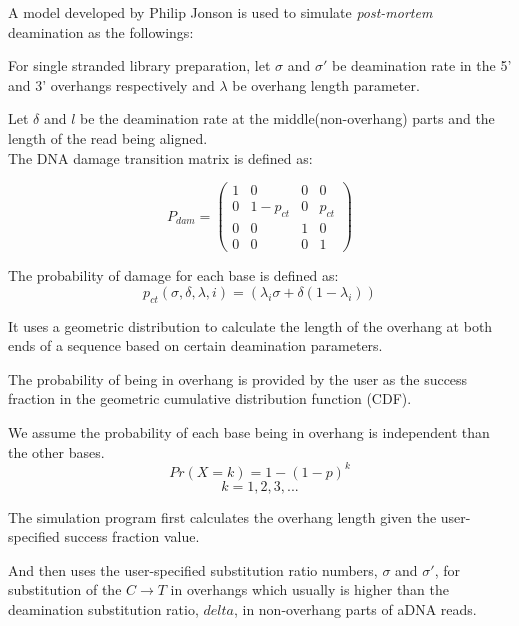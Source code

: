 \documentclass[11pt,a4paper]{report}
\begin{document}
A model developed by Philip Jonson \cite{mapdamage2} is used
to simulate \emph{post-mortem} deamination as the followings:

For single stranded library preparation,
let $\sigma$ and $\sigma\prime $ be deamination rate in the 5' and 3' overhangs respectively and $\lambda$ be overhang length parameter. 

Let  $\delta$ and $l$ be the
deamination rate at the middle(non-overhang) parts and the length of the read being aligned.\\

The DNA damage transition matrix is defined as:

$$ P_{dam} = 
 \begin{pmatrix}
  1 & 0 & 0 & 0 \\
  0 & 1-p_{ct} & 0 & p_{ct} \\
  0  & 0  & 1 & 0  \\
  0 & 0 & 0 & 1 
 \end{pmatrix}$$
 

The probability of damage for each base is defined  
as\cite{mapdamage2}:\\
$$ p_{ct}(\sigma, \delta, \lambda, i) = ( \lambda_{i} \sigma + \delta(1 - \lambda_{i})) $$
 
It uses a geometric distribution to calculate the length of the overhang at both ends of a sequence based on certain deamination parameters.
 

The probability of being in overhang is provided by the user as the success fraction in the geometric cumulative distribution function (CDF).


We assume the probability of each base being in overhang is independent than the other bases.\\

$$Pr( X=k ) = 1 - (1 - p)^{k}$$
$$ k = 1, 2, 3, ... $$


The simulation program first calculates the overhang length given the user-specified success fraction value.


And then uses the user-specified substitution ratio numbers,
 $ \sigma $ and $\sigma\prime $, for substitution of 
 the $ C \rightarrow T $ 
in overhangs which usually is higher than the deamination substitution ratio, $delta$, in non-overhang parts of aDNA reads.

 
\end{document}
